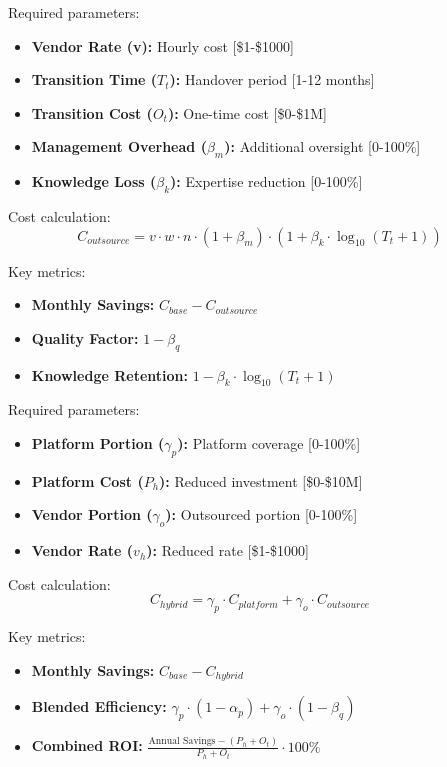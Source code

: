 \documentclass[12pt,a4paper]{article}
\newenvironment{definition}[1]
{\begin{mdframed}[style=definitionstyle,frametitle={Definition: #1}]}
{\end{mdframed}}
\begin{document}
\begin{definition}{Team Outsourcing Solution Inputs}
Required parameters:
\begin{itemize}
    \item \textbf{Vendor Rate (v):} Hourly cost [\$1-\$1000]
    \item \textbf{Transition Time ($T_t$):} Handover period [1-12 months]
    \item \textbf{Transition Cost ($O_t$):} One-time cost [\$0-\$1M]
    \item \textbf{Management Overhead ($\beta_m$):} Additional oversight [0-100\%]
    \item \textbf{Knowledge Loss ($\beta_k$):} Expertise reduction [0-100\%]
\end{itemize}

Cost calculation:
\begin{equation}
    C_{outsource} = v \cdot w \cdot n \cdot (1 + \beta_m) \cdot (1 + \beta_k \cdot \log_{10}(T_t + 1))
\end{equation}

Key metrics:
\begin{itemize}
    \item \textbf{Monthly Savings:} $C_{base} - C_{outsource}$
    \item \textbf{Quality Factor:} $1 - \beta_q$
    \item \textbf{Knowledge Retention:} $1 - \beta_k \cdot \log_{10}(T_t + 1)$
\end{itemize}
\end{definition}

\begin{definition}{Team Hybrid Solution Inputs}
Required parameters:
\begin{itemize}
    \item \textbf{Platform Portion ($\gamma_p$):} Platform coverage [0-100\%]
    \item \textbf{Platform Cost ($P_h$):} Reduced investment [\$0-\$10M]
    \item \textbf{Vendor Portion ($\gamma_o$):} Outsourced portion [0-100\%]
    \item \textbf{Vendor Rate ($v_h$):} Reduced rate [\$1-\$1000]
\end{itemize}

Cost calculation:
\begin{equation}
    C_{hybrid} = \gamma_p \cdot C_{platform} + \gamma_o \cdot C_{outsource}
\end{equation}

Key metrics:
\begin{itemize}
    \item \textbf{Monthly Savings:} $C_{base} - C_{hybrid}$
    \item \textbf{Blended Efficiency:} $\gamma_p \cdot (1 - \alpha_p) + \gamma_o \cdot (1 - \beta_q)$
    \item \textbf{Combined ROI:} $\frac{\text{Annual Savings} - (P_h + O_t)}{P_h + O_t} \cdot 100\%$
\end{itemize}
\end{definition}
\end{document}
